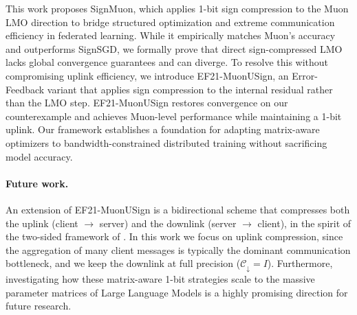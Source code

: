 \documentclass[letterpaper]{article} %
\begin{document}


This work proposes SignMuon, which applies 1-bit sign compression to the Muon LMO direction to bridge structured optimization and extreme communication efficiency in federated learning. While it empirically matches Muon's accuracy and outperforms SignSGD, we formally prove that direct sign-compressed LMO lacks global convergence guarantees and can diverge. To resolve this without compromising uplink efficiency, we introduce EF21-MuonUSign, an Error-Feedback variant that applies sign compression to the internal residual rather than the LMO step. EF21-MuonUSign restores convergence on our counterexample and achieves Muon-level performance while maintaining a 1-bit uplink. Our framework establishes a foundation for adapting matrix-aware optimizers to bandwidth-constrained distributed training without sacrificing model accuracy.
\paragraph{Future work.} An extension of EF21-MuonUSign is a bidirectional scheme that compresses both the uplink (client $\to$ server) and the downlink (server $\to$ client), in the spirit of the two-sided framework of \citet{gruntkowska2025error}. In this work we focus on uplink compression, since the aggregation of many client messages is typically the dominant communication bottleneck, and we keep the downlink at full precision ($\mathcal{C}_{\downarrow} = I$). Furthermore, investigating how these matrix-aware 1-bit strategies scale to the massive parameter matrices of Large Language Models is a highly promising direction for future research.
\end{document}

